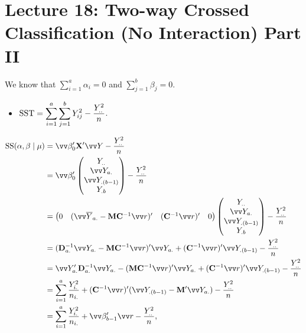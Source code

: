 \section{Lecture 18: Two-way Crossed Classification (No Interaction) Part II}
We know that
$ \sum_{i=1}^{a}\alpha_i=0 $ and $ \sum_{j=1}^{b}\beta_j=0 $.
\begin{itemize}
    \item $ \text{SST}=\displaystyle \sum_{i=1}^{a}\sum_{j=1}^{b}Y_{ij}^2-\frac{Y_{..}^2}{n} $.
\end{itemize}
\begin{align*}
    \text{SS}(\alpha,\beta\mid \mu)
     & =\Vector{\beta}_0'\Matrix{X}'\Vector{Y}-\frac{Y_{..}^2}{n}                                                                                                                    \\
     & =\Vector{\beta}_0'\begin{pmatrix}
                             Y_{..}              \\
                             \Vector{Y}_{a.}     \\
                             \Vector{Y}_{.(b-1)} \\
                             Y_{.b}
                         \end{pmatrix}  -\frac{Y_{..}^2}{n}                                                                                                                          \\
     & =\begin{pmatrix}
            0                                                             &
            ( \Vector{\bar{Y}}_{a.}-\Matrix{M}\Matrix{C}^{-1}\Vector{r})' &
            ( \Matrix{C}^{-1}\Vector{r} )'                                &
            0
        \end{pmatrix}\begin{pmatrix}
                         Y_{..}              \\
                         \Vector{Y}_{a.}     \\
                         \Vector{Y}_{.(b-1)} \\
                         Y_{.b}
                     \end{pmatrix}   -\frac{Y_{..}^2}{n}                                                                                                \\
     & =(\Matrix{D}_{a.}^{-1}\Vector{Y}_{a.}-\Matrix{M}\Matrix{C}^{-1}\Vector{r})'\Vector{Y}_{a.}+(\Matrix{C}^{-1}\Vector{r})'\Vector{Y}_{.(b-1)}-\frac{Y_{..}^2}{n}                 \\
     & =\Vector{Y}_{a.}'\Matrix{D}_{a.}^{-1}\Vector{Y}_{a.}-(\Matrix{M}\Matrix{C}^{-1}\Vector{r})'\Vector{Y}_{a.}+(\Matrix{C}^{-1}\Vector{r})'\Vector{Y}_{.(b-1)}-\frac{Y_{..}^2}{n} \\
     & =\sum_{i=1}^{a}\frac{Y_{i.}^2}{n_{i.}}+(\Matrix{C}^{-1}\Vector{r})'(\Vector{Y}_{.(b-1)}-\Matrix{M}'\Vector{Y}_{a.})-\frac{Y_{..}^2}{n}                                        \\
     & =\sum_{i=1}^{a}\frac{Y_{i.}^2}{n_{i.}}+\Vector{\beta}_{b-1}'\Vector{r}-\frac{Y_{..}^2}{n},
\end{align*}
